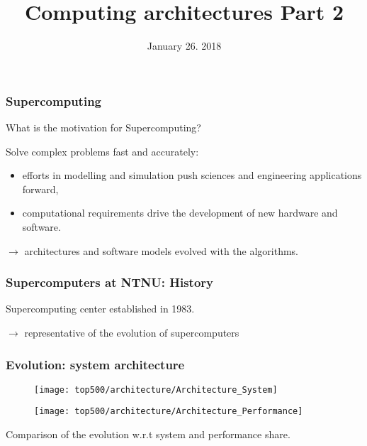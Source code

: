 

\title{Computing architectures Part 2}
\date{January 26. 2018}
\maketitle

\begin{frame}
  \frametitle{Supercomputing}

\begin{center}
What is the motivation for Supercomputing?
\end{center}

\vspace{2ex}

Solve complex problems fast and accurately:
\begin{itemize}
\item efforts in modelling and simulation push sciences and engineering applications forward,
\item computational requirements drive the development of new hardware and software.
\end{itemize}

\medskip
$\rightarrow$ architectures and software models evolved with the algorithms.

\end{frame}

\begin{frame}
  \frametitle{Supercomputers at NTNU: History}

Supercomputing center established in 1983.
  \begin{center}
    \scalebox{0.8}{
      
    }
  \end{center}

\medskip
$\rightarrow$ representative of the evolution of supercomputers

\end{frame}


\begin{frame}
  \frametitle{Evolution: system architecture}

\begin{minipage}[bc]{0.4\linewidth}
\centering
\begin{figure}
\centering
\texttt{[image: top500/architecture/Architecture\_System]}
\end{figure}
\end{minipage}
\begin{minipage}[bc]{0.4\linewidth}
\centering
\begin{figure}
\centering
\texttt{[image: top500/architecture/Architecture\_Performance]}
\end{figure}
\end{minipage}

\smallskip
Comparison of the evolution w.r.t system and performance share.
\end{frame}

